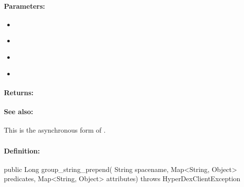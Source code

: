 \paragraph{Parameters:}
\begin{itemize}[noitemsep]
\item {}\\

\item {}\\

\item {}\\

\item {}\\

\end{itemize}

\paragraph{Returns:}


\paragraph{See also:}  This is the asynchronous form of .

\pagebreak
\subsubsection{}
\label{api:java:group_string_prepend}


\paragraph{Definition:}
\begin{javacode}
public Long group_string_prepend(
        String spacename,
        Map<String, Object> predicates,
        Map<String, Object> attributes) throws HyperDexClientException
\end{javacode}


